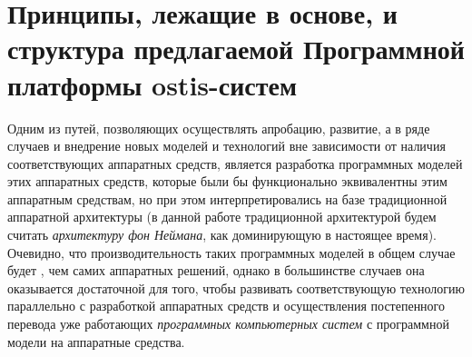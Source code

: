 \section{Принципы, лежащие в основе, и структура предлагаемой Программной платформы ostis-систем}
\label{sec_soft_platform_description}

Одним из путей, позволяющих осуществлять апробацию, развитие, а в ряде случаев и внедрение новых моделей и технологий вне зависимости от наличия соответствующих аппаратных средств, является разработка программных моделей этих аппаратных средств, которые были бы функционально эквивалентны этим аппаратным средствам, но при этом интерпретировались на базе традиционной аппаратной архитектуры (в данной работе традиционной архитектурой будем считать \textit{архитектуру фон Неймана}, как доминирующую в настоящее время). Очевидно, что производительность таких программных моделей в общем случае будет , чем самих аппаратных решений, однако в большинстве случаев она оказывается достаточной для того, чтобы развивать соответствующую технологию параллельно с разработкой аппаратных средств и осуществления постепенного перевода уже работающих \textit{программных компьютерных систем} с программной модели на аппаратные средства.

